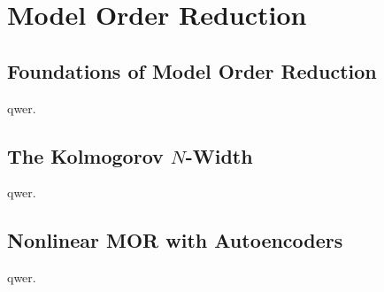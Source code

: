 \chapter{Model Order Reduction}\label{chap:model-order-reduction}

\section{Foundations of Model Order Reduction}\label{sec:foundations-mor}

qwer.

\section[The Kolmogorov N-Width]{The Kolmogorov {$N$}-Width}\label{sec:kolmogorov-n-width}

qwer.

\section{Nonlinear MOR with Autoencoders}\label{sec:nonlinear-mor-autoencoders}

qwer.
